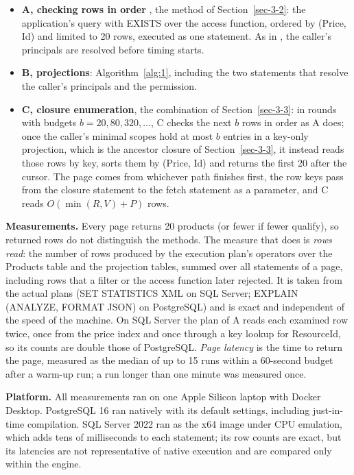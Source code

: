 \documentclass[conference]{IEEEtran}
\providecommand{\tightlist}{\setlength{\itemsep}{0pt}\setlength{\parskip}{0pt}}
\begin{document}
\begin{itemize}
\tightlist
\item
  \textbf{A, checking rows in order} \cite{ref8}, the method of Section~\ref{sec-3-2}: the application's query with EXISTS over the access function, ordered by (Price, Id) and limited to 20 rows, executed as one statement. As in \cite{ref8}, the caller's principals are resolved before timing starts.
\item
  \textbf{B, projections}: Algorithm~\ref{alg:1}, including the two statements that resolve the caller's principals and the permission.
\item
  \textbf{C, closure enumeration}, the combination of Section~\ref{sec-3-3}: in rounds with budgets \(b = 20, 80, 320, \ldots\), C checks the next \(b\) rows in order as A does; once the caller's minimal scopes hold at most \(b\) entries in a key-only projection, which is the ancestor closure of Section~\ref{sec-3-3}, it instead reads those rows by key, sorts them by (Price, Id) and returns the first 20 after the cursor. The page comes from whichever path finishes first, the row keys pass from the closure statement to the fetch statement as a parameter, and C reads \(O(\min(R, V) + P)\) rows.
\end{itemize}

\textbf{Measurements.} Every page returns 20 products (or fewer if fewer qualify), so returned rows do not distinguish the methods. The measure that does is \emph{rows read}: the number of rows produced by the execution plan's operators over the Products table and the projection tables, summed over all statements of a page, including rows that a filter or the access function later rejected. It is taken from the actual plans (SET STATISTICS XML on SQL Server; EXPLAIN (ANALYZE, FORMAT JSON) on PostgreSQL) and is exact and independent of the speed of the machine. On SQL Server the plan of A reads each examined row twice, once from the price index and once through a key lookup for ResourceId, so its counts are double those of PostgreSQL. \emph{Page latency} is the time to return the page, measured as the median of up to 15 runs within a 60-second budget after a warm-up run; a run longer than one minute was measured once.

\textbf{Platform.} All measurements ran on one Apple Silicon laptop with Docker Desktop. PostgreSQL 16 ran natively with its default settings, including just-in-time compilation. SQL Server 2022 ran as the x64 image under CPU emulation, which adds tens of milliseconds to each statement; its row counts are exact, but its latencies are not representative of native execution and are compared only within the engine.
\end{document}
